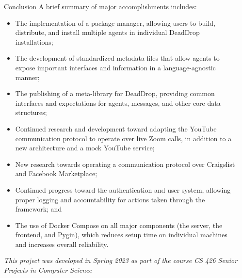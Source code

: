 \documentclass[final]{beamer}
\newlength{\sepwidth}
\newlength{\colwidth}
\newcommand{\separatorcolumn}{\begin{column}{\sepwidth}\end{column}}
\begin{document}
\begin{frame}[t]
\begin{columns}[t]
\begin{column}{\colwidth}
\begin{block}{Conclusion}
    A brief summary of major accomplishments includes:
    \begin{itemize}
      \item
        The implementation of a package manager, allowing users to build, distribute, and install multiple agents in individual DeadDrop installations;
      \item
        The development of standardized metadata files that allow agents to expose important interfaces and information in a language-agnostic manner;
      \item
        The publishing of a meta-library for DeadDrop, providing common interfaces and expectations for agents, messages, and other core data structures;
      \item
        Continued research and development toward adapting the YouTube communication protocol to operate over live Zoom calls, in addition to a new architecture and a mock YouTube service;
      \item
        New research towards operating a communication protocol over Craigslist and Facebook Marketplace;
      \item
        Continued progress toward the authentication and user system, allowing proper logging and accountability for actions taken through the framework; and
      \item
        The use of Docker Compose on all major components (the server, the frontend, and Pygin), which reduces setup time on individual machines and increases overall reliability.
    \end{itemize}


  \end{block}

  
  \begin{block}{}
    
    \it{This project was developed in Spring 2023 as part of the course CS 426 Senior Projects in Computer Science}

  \end{block}

\end{column}

\separatorcolumn
\end{columns}
\end{frame}
\end{document}
